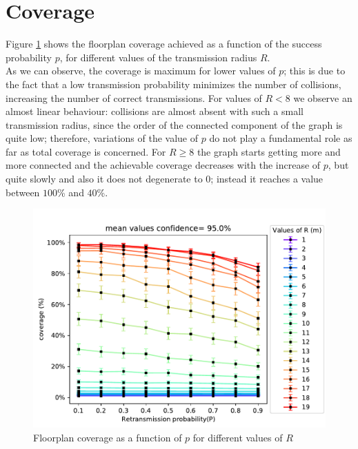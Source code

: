 \section{Coverage}\label{ssec:coverage}
Figure \ref{fig:coveragePR} shows the floorplan coverage achieved as a function
of the success probability $p$, for different values of the transmission radius
$R$.\\
As we can observe, the coverage is maximum for lower values of $p$; this is due
to the fact that a low transmission probability minimizes the number of
collisions, increasing the number of correct transmissions. For values of
$R < 8$ we observe an almost linear behaviour: collisions are almost absent
with such a small transmission radius, since the order of the connected
component of the graph is quite low; therefore, variations of the value of $p$
do not play a fundamental role as far as total coverage is concerned. For
$R \geq 8$ the graph starts getting more and more connected and the achievable
coverage decreases with the increase of $p$, but quite slowly and also it does
not degenerate to $0$; instead it reaches a value between $100$\% and $40$\%.
\begin{figure}[H]
    \begin{center}
        \includegraphics[scale=.62,trim={0 0 0 0.8cm},clip]{img/big_coverage_p_mean_95.0.pdf}
    \end{center}
    \vspace*{-0.5cm}
    \caption{Floorplan coverage as a function of $p$ for different values of $R$}
    \label{fig:coveragePR}
\end{figure}
\noindent
